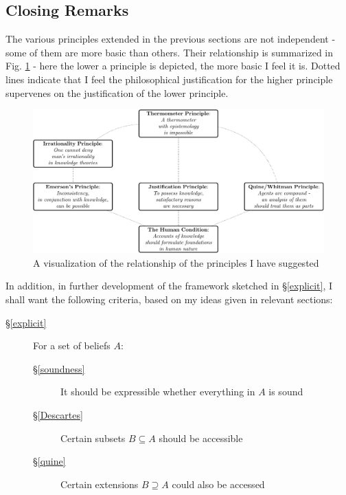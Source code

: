 \documentclass[11pt]{article}
\numberwithin{equation}{subsection}
\begin{document}
\subsection{Closing Remarks}
\label{close}
The various principles extended in the previous sections are not
independent - some of them are more basic than others.  Their
relationship is summarized in Fig. \ref{fig:principles} - here the
lower a principle is depicted, the more basic I feel it is.  Dotted
lines indicate that I feel the philosophical justification for the
higher principle supervenes on the justification of the lower
principle.
\begin{figure}[ht]
\begin{center}
\includegraphics[width=\textwidth]{principles/principles.pdf} 
\end{center}
\caption{A visualization of the relationship of the principles I have suggested}
\label{fig:principles}
\end{figure}
In addition, in further development of the framework sketched in \S\ref{explicit}, I shall want the following criteria, based on my ideas given in relevant sections:
\begin{description}
 \item[\S\ref{explicit}] 
  \item[] For a set of beliefs $A$:
\begin{description}
  \item[\S\ref{soundness}] It should be expressible whether everything in $A$ is sound 
  \item[\S\ref{Descartes}] Certain subsets $B\subseteq A$ should be accessible
  \item[\S\ref{quine}] Certain extensions $B \supseteq A$ could also be accessed
\end{description}
\end{description}
\end{document}
